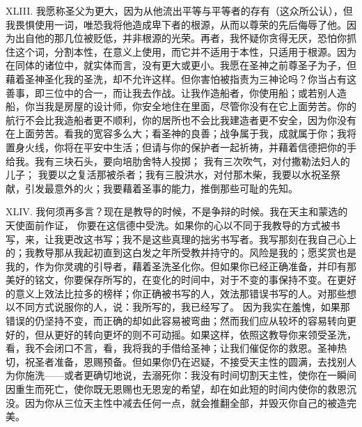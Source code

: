 XLIII. 我愿称圣父为更大，因为从他流出平等与平等者的存有（这众所公认），但我畏惧使用一词，唯恐我将他造成卑下者的根源，从而以尊荣的先后侮辱了他。因为出自他的那几位被贬低，并非根源的光荣。再者，我怀疑你贪得无厌，恐怕你抓住这个词，分割本性，在意义上使用，而它并不适用于本性，只适用于根源。因为在同体的诸位中，就实体而言，没有更大或更小。我愿在圣神之前尊圣子为子，但藉着圣神圣化我的圣洗，却不允许这样。但你害怕被指责为三神论吗？你当占有这善事，即三位中的合一，而让我去作战。让我作造船者，你使用船；或若别人造船，你当我是房屋的设计师，你安全地住在里面，尽管你没有在它上面劳苦。你的航行不会比我造船者更不顺利，你的居所也不会比我建造者更不安全，因为你没有在上面劳苦。看我的宽容多么大；看圣神的良善；战争属于我，成就属于你；我将置身火线，你将在平安中生活；但请与你的保护者一起祈祷，并藉着信德把你的手给我。我有三块石头，要向培肋舍特人投掷； 我有三次吹气，对付撒勒法妇人的儿子； 我要以之复活那被杀者；我有三股洪水，对付那木柴，我要以水祝圣祭献，引发最意外的火；我要藉着圣事的能力，推倒那些可耻的先知。\par

XLIV. 我何须再多言？现在是教导的时候，不是争辩的时候。我在天主和蒙选的天使面前作证， 你要在这信德中受洗。如果你的心以不同于我教导的方式被书写，来，让我更改这书写；我不是这些真理的拙劣书写者。我写那刻在我自己心上的；我教导那从我起初直到这白发之年所受教并持守的。风险是我的；愿奖赏也是我的，作为你灵魂的引导者，藉着圣洗圣化你。但如果你已经正确准备，并印有那美好的铭文，你要保存所写的，在变化的时间中，对于不变的事保持不变。在更好的意义上效法比拉多的榜样；你正确被书写的人，效法那错误书写的人。对那些想以不同方式说服你的人，说：我所写的，我已经写了。 因为我实在羞愧，如果那错误的仍坚持不变，而正确的却如此容易被弯曲；然而我们应从较坏的容易转向更好的，但从更好的转向更坏的则不可动摇。如果这样，依照这教导你来领受圣洗，看，我不会闭口不言，看，我将我的手借给圣神；让我们催促你的救恩。圣神热切，祝圣者准备，恩赐预备。但如果你仍在迟疑，不接受天主性的圆满，去找别人为你施洗——或者更确切地说，去溺死你：我没有时间切割天主性，使你在一瞬间因重生而死亡，使你既无恩赐也无恩宠的希望，却在如此短的时间内使你的救恩沉没。因为你从三位天主性中减去任何一点，就会推翻全部，并毁灭你自己的被造完美。\par

